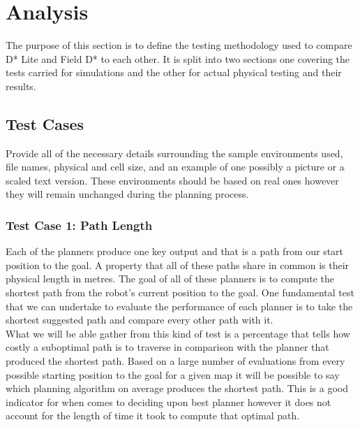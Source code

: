 \chapter{Analysis}

\noindent
The purpose of this section is to define the testing methodology used to compare D* Lite and Field D* to each other. It is split into two sections one covering the tests carried for simulations and the other for actual physical testing and their results.


\section{Test Cases}

\noindent
Provide all of the necessary details surrounding the sample environments used, file names, physical and cell size, and an example of one possibly a picture or a scaled text version. These environments should be based on real ones however they will remain unchanged during the planning process.

\newpage

\subsection{Test Case 1: Path Length}

\noindent 
Each of the planners produce one key output and that is a path from our start position to the goal. A property that all of these paths share in common is their physical length in metres. The goal of all of these planners is to compute the shortest path from the robot's current position to the goal. One fundamental test that we can undertake to evaluate the performance of each planner is to take the shortest suggested path and compare every other path with it. \\

\noindent
What we will be able gather from this kind of test is a percentage that tells how costly a suboptimal path is to traverse in comparison with the planner that produced the shortest path. Based on a large number of evaluations from every possible starting position to the goal for a given map it will be possible to say which planning algorithm on average produces the shortest path. This is a good indicator for when comes to deciding upon best planner however it does not account for the length of time it took to compute that optimal path. \\

